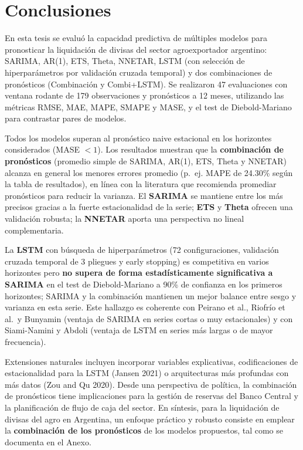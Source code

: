 \documentclass[
  12pt, a4paper, oneside]{article}
\begin{document}
\section{Conclusiones}\label{conclusiones}

En esta tesis se evaluó la capacidad predictiva de múltiples modelos para pronosticar la liquidación de divisas del sector agroexportador argentino: SARIMA, AR(1), ETS, Theta, NNETAR, LSTM (con selección de hiperparámetros por validación cruzada temporal) y dos combinaciones de pronósticos (Combinación y Combi+LSTM). Se realizaron 47 evaluaciones con ventana rodante de 179 observaciones y pronósticos a 12 meses, utilizando las métricas RMSE, MAE, MAPE, SMAPE y MASE, y el test de Diebold-Mariano para contrastar pares de modelos.

Todos los modelos superan al pronóstico naive estacional en los horizontes considerados (MASE \(<1\)). Los resultados muestran que la \textbf{combinación de pronósticos} (promedio simple de SARIMA, AR(1), ETS, Theta y NNETAR) alcanza en general los menores errores promedio (p.~ej. MAPE de 24.30\% según la tabla de resultados), en línea con la literatura que recomienda promediar pronósticos para reducir la varianza. El \textbf{SARIMA} se mantiene entre los más precisos gracias a la fuerte estacionalidad de la serie; \textbf{ETS} y \textbf{Theta} ofrecen una validación robusta; la \textbf{NNETAR} aporta una perspectiva no lineal complementaria.

La \textbf{LSTM} con búsqueda de hiperparámetros (72 configuraciones, validación cruzada temporal de 3 pliegues y early stopping) es competitiva en varios horizontes pero \textbf{no supera de forma estadísticamente significativa a SARIMA} en el test de Diebold-Mariano a 90\% de confianza en los primeros horizontes; SARIMA y la combinación mantienen un mejor balance entre sesgo y varianza en esta serie. Este hallazgo es coherente con Peirano et al., Riofrío et al.~y Bunyamin (ventaja de SARIMA en series cortas o muy estacionales) y con Siami-Namini y Abdoli (ventaja de LSTM en series más largas o de mayor frecuencia).

Extensiones naturales incluyen incorporar variables explicativas, codificaciones de estacionalidad para la LSTM (Jansen 2021) o arquitecturas más profundas con más datos (Zou and Qu 2020). Desde una perspectiva de política, la combinación de pronósticos tiene implicaciones para la gestión de reservas del Banco Central y la planificación de flujo de caja del sector. En síntesis, para la liquidación de divisas del agro en Argentina, un enfoque práctico y robusto consiste en emplear la \textbf{combinación de los pronósticos} de los modelos propuestos, tal como se documenta en el Anexo.
\end{document}
